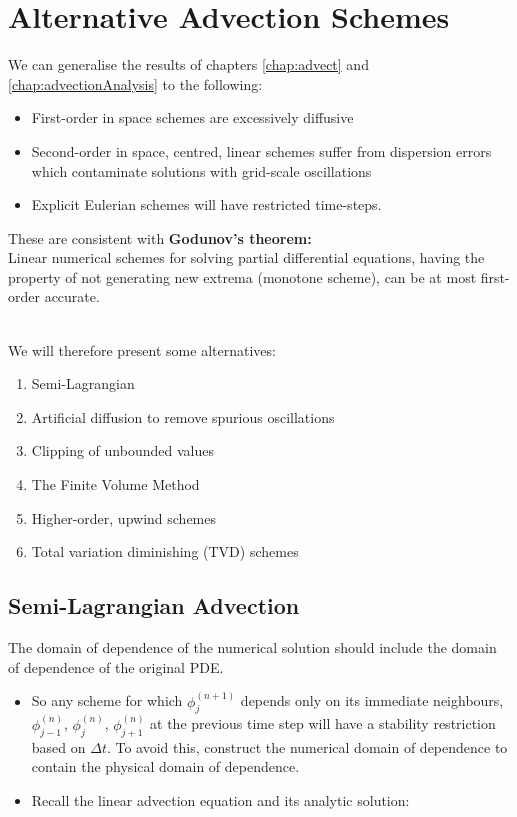 \chapter{Alternative Advection Schemes}

We can generalise the results of chapters \ref{chap:advect} and \ref{chap:advectionAnalysis} to the following:
\begin{itemize}
\item First-order in space schemes are excessively diffusive
\item Second-order in space, centred, linear schemes suffer from dispersion errors which contaminate solutions with grid-scale oscillations
\item Explicit Eulerian schemes will have restricted time-steps.
\end{itemize}

These are consistent with {\bf Godunov's theorem:}\\
Linear numerical schemes for solving partial differential equations, having the property of not generating new extrema (monotone scheme), can be at most first-order accurate.

\ \\
We will therefore present some alternatives:
\begin{enumerate}
\item Semi-Lagrangian
\item Artificial diffusion to remove spurious oscillations
\item Clipping of unbounded values
\item The Finite Volume Method
\item Higher-order, upwind schemes
\item Total variation diminishing (TVD) schemes
\end{enumerate}

\clearpage
\section{Semi-Lagrangian Advection}

 The domain of dependence of the numerical
solution should include the domain of dependence of the original PDE.

\begin{itemize}
\item So any scheme for which $\phi_j^{(n+1)}$ depends only on its immediate neighbours, $\phi_{j-1}^{(n)}$,  $\phi_{j}^{(n)}$,  $\phi_{j+1}^{(n)}$ at the previous time step will have a stability restriction based on $\Delta t$. To avoid this, construct the numerical domain of dependence to contain the physical domain of dependence. 

\item Recall the linear advection equation and its analytic solution:
\end{itemize}

